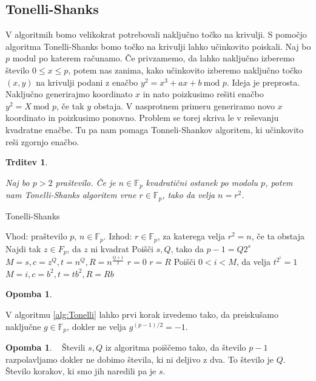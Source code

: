\documentclass[12pt,a4paper,twoside]{article}
\theoremstyle{definition} %
\newtheorem{opomba}[definicija]{Opomba}
\theoremstyle{plain} %
\newtheorem{trditev}[definicija]{Trditev}
\numberwithin{equation}{section}  %
\newcommand{\F}{\mathbb F}
\begin{document}
\subsection{Tonelli-Shanks}
V algoritmih bomo velikokrat potrebovali naključno točko na krivulji. S pomočjo algoritma Tonelli-Shanks bomo točko na krivulji lahko učinkovito poiskali. Naj bo $p$ modul po katerem računamo.
Če privzamemo, da lahko naključno izberemo število $0 \leq x \leq p$, potem nas zanima, kako učinkovito izberemo naključno točko $(x,y)$ na krivulji podani z enačbo
$y^2 = x^3 +ax+b \ \text{mod } p$. Ideja je preprosta. Naključno generirajmo koordinato $x$ in nato poizkusimo rešiti enačbo $y^2 = X \ \text{mod } p$, če tak $y$ obstaja. V nasprotnem primeru generiramo novo $x$ koordinato in poizkusimo ponovno. Problem se torej skriva le v reševanju kvadratne enačbe. Tu pa nam pomaga Tonneli-Shankov algoritem, ki učinkovito reši zgornjo enačbo.

\begin{trditev}~

Naj bo $p > 2$ praštevilo. Če je $n \in \F_p$ kvadratični ostanek po modolu $p$, potem nam Tonelli-Shanks algoritem vrne $r \in \F_p$, tako da velja $n = r^2$.

\end{trditev}

\begin{algorithm}[H]
\caption[Tonelli]{Tonelli-Shanks}
\label{alg:Tonelli}

\begin{algorithmic}
\State Vhod: praštevilo $p$, $n \in \F_p$.
\State Izhod: $r \in \F_p$, za katerega velja $r^2=n$, če ta obstaja
\State Najdi tak $z \in F_p$, da $z$ ni kvadrat
\State Poišči $s,Q$, tako da $p-1 = Q2^s$
\State $M = s,c = z^Q,t = n^Q,R=n^{\frac{Q+1}{2}}$
		\State \Return $r=0$
		\State \Return $r=R$
	\Else
		\State Poišči $0<i<M$, da velja $t^{2^i} = 1$
		\State  $M = i,c = b^2,t = tb^2,R=Rb$
	\EndIf
\EndWhile
\end{algorithmic}
\end{algorithm}

\begin{opomba}~

V algoritmu \ref{alg:Tonelli} lahko prvi korak izvedemo tako, da preiskušamo naključne $g\in \F_p$, dokler ne velja $g^{(p-1)/2} = -1$.
\end{opomba}

\begin{opomba}~
Števili $s, Q$ iz algoritma poiščemo tako, da število $p-1$ razpolavljamo dokler ne dobimo števila, ki ni deljivo z dva. To število je $Q$. Število korakov, ki smo jih naredili pa je $s$.
\end{opomba}
\end{document}
